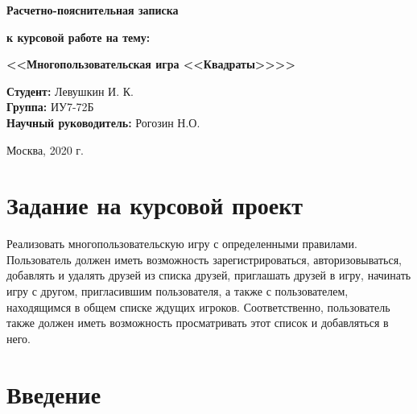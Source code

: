 \documentclass[a4paper,14pt]{extarticle}
\begin{document}
 	\vspace*{30mm}
 	
 	\LARGE
 	\begin{center}
 		\textbf{Расчетно-пояснительная записка}
 		
 		\textbf{к курсовой работе на тему:}
 		
 		\textbf{<<Многопользовательская игра <<Квадраты>>>>}
 	\end{center}
 	
 	\vspace*{15mm}
 	
 	\large
 	\begin{flushleft}
 		\textbf{Студент:} Левушкин И. К. \\
 		\textbf{Группа:} ИУ7-72Б \\
 		\textbf{Научный руководитель:} Рогозин Н.О.
 	\end{flushleft}
 	
 	\vspace*{50mm}
 	
 	\large
 	\begin{center}
 		Москва, 2020 г.
 	\end{center}
 	
 	\thispagestyle{empty}
 	
 	\newpage
 	
 	\section*{Задание на курсовой проект}
 	
 	Реализовать многопользовательскую игру с определенными правилами. Пользователь должен иметь возможность зарегистрироваться, авторизовываться, добавлять и удалять друзей из списка друзей, приглашать друзей в игру, начинать игру с другом, пригласившим пользователя, а также с пользователем, находящимся в общем списке ждущих игроков. Соответственно, пользователь также должен иметь возможность просматривать этот список и добавляться в него.
 	
 	
 	
 	\newpage
 	
 	\tableofcontents
 	\newpage
 	\section*{Введение}
 	
\end{document}
